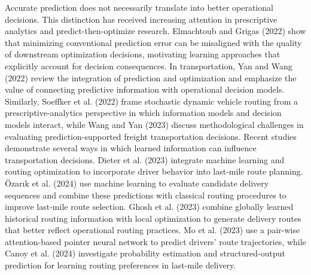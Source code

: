 \documentclass[11pt,a4paper]{article}
\begin{document}
Accurate prediction does not necessarily translate into better
operational decisions. This distinction has received increasing
attention in prescriptive analytics and predict-then-optimize research.
Elmachtoub and Grigas (2022) show that minimizing conventional
prediction error can be misaligned with the quality of downstream
optimization decisions, motivating learning approaches that explicitly
account for decision consequences. In transportation, Yan and Wang
(2022) review the integration of prediction and optimization and
emphasize the value of connecting predictive information with
operational decision models. Similarly, Soeffker et al. (2022) frame
stochastic dynamic vehicle routing from a prescriptive-analytics
perspective in which information models and decision models interact,
while Wang and Yan (2023) discuss methodological challenges in
evaluating prediction-supported freight transportation decisions. Recent
studies demonstrate several ways in which learned information can
influence transportation decisions. Dieter et al. (2023) integrate
machine learning and routing optimization to incorporate driver behavior
into last-mile route planning. Özarık et al. (2024) use machine learning
to evaluate candidate delivery sequences and combine these predictions
with classical routing procedures to improve last-mile route selection.
Ghosh et al. (2023) combine globally learned historical routing
information with local optimization to generate delivery routes that
better reflect operational routing practices. Mo et al. (2023) use a
pair-wise attention-based pointer neural network to predict
drivers' route trajectories, while Canoy et al. (2024)
investigate probability estimation and structured-output prediction for
learning routing preferences in last-mile delivery.
\end{document}
